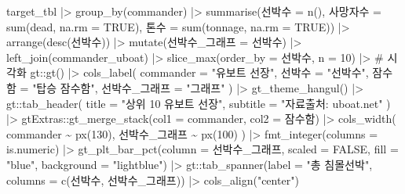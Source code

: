 \documentclass[
  letterpaper,
  chapter,a4paper,showtrims,openright,hidelinks]{oblivoir}
\newenvironment{Shaded}{\begin{snugshade}}{\end{snugshade}}
\newcommand{\AttributeTok}[1]{\textcolor[rgb]{0.40,0.45,0.13}{#1}}
\newcommand{\CommentTok}[1]{\textcolor[rgb]{0.37,0.37,0.37}{#1}}
\newcommand{\ConstantTok}[1]{\textcolor[rgb]{0.56,0.35,0.01}{#1}}
\newcommand{\DecValTok}[1]{\textcolor[rgb]{0.68,0.00,0.00}{#1}}
\newcommand{\FunctionTok}[1]{\textcolor[rgb]{0.28,0.35,0.67}{#1}}
\newcommand{\NormalTok}[1]{\textcolor[rgb]{0.00,0.23,0.31}{#1}}
\newcommand{\OtherTok}[1]{\textcolor[rgb]{0.00,0.23,0.31}{#1}}
\newcommand{\SpecialCharTok}[1]{\textcolor[rgb]{0.37,0.37,0.37}{#1}}
\newcommand{\StringTok}[1]{\textcolor[rgb]{0.13,0.47,0.30}{#1}}
\begin{document}
\begin{Shaded}
\begin{Highlighting}[]
\NormalTok{target\_tbl }\SpecialCharTok{|\textgreater{}} 
  \FunctionTok{group\_by}\NormalTok{(commander) }\SpecialCharTok{|\textgreater{}} 
  \FunctionTok{summarise}\NormalTok{(선박수 }\OtherTok{=} \FunctionTok{n}\NormalTok{(),}
\NormalTok{            사망자수 }\OtherTok{=} \FunctionTok{sum}\NormalTok{(dead, }\AttributeTok{na.rm =} \ConstantTok{TRUE}\NormalTok{),}
\NormalTok{            톤수 }\OtherTok{=} \FunctionTok{sum}\NormalTok{(tonnage, }\AttributeTok{na.rm =} \ConstantTok{TRUE}\NormalTok{)) }\SpecialCharTok{|\textgreater{}} 
  \FunctionTok{arrange}\NormalTok{(}\FunctionTok{desc}\NormalTok{(선박수)) }\SpecialCharTok{|\textgreater{}} 
  \FunctionTok{mutate}\NormalTok{(선박수\_그래프 }\OtherTok{=}\NormalTok{ 선박수) }\SpecialCharTok{|\textgreater{}} 
  \FunctionTok{left\_join}\NormalTok{(commander\_uboat) }\SpecialCharTok{|\textgreater{}} 
  \FunctionTok{slice\_max}\NormalTok{(}\AttributeTok{order\_by =}\NormalTok{ 선박수, }\AttributeTok{n =} \DecValTok{10}\NormalTok{) }\SpecialCharTok{|\textgreater{}} 
  \CommentTok{\# 시각화 }
\NormalTok{  gt}\SpecialCharTok{::}\FunctionTok{gt}\NormalTok{() }\SpecialCharTok{|\textgreater{}} 
    \FunctionTok{cols\_label}\NormalTok{(}
      \AttributeTok{commander =} \StringTok{"유보트 선장"}\NormalTok{,}
\NormalTok{      선박수 }\OtherTok{=} \StringTok{"선박수"}\NormalTok{,}
\NormalTok{      잠수함 }\OtherTok{=} \StringTok{"탑승 잠수함"}\NormalTok{,}
\NormalTok{      선박수\_그래프 }\OtherTok{=} \StringTok{"그래프"}
\NormalTok{    )  }\SpecialCharTok{|\textgreater{}} 
    \FunctionTok{gt\_theme\_hangul}\NormalTok{() }\SpecialCharTok{|\textgreater{}} 
\NormalTok{    gt}\SpecialCharTok{::}\FunctionTok{tab\_header}\NormalTok{(}
      \AttributeTok{title =} \StringTok{"상위 10 유보트 선장"}\NormalTok{, }
      \AttributeTok{subtitle =} \StringTok{"자료출처: uboat.net"}
\NormalTok{    ) }\SpecialCharTok{|\textgreater{}} 
\NormalTok{    gtExtras}\SpecialCharTok{::}\FunctionTok{gt\_merge\_stack}\NormalTok{(}\AttributeTok{col1 =}\NormalTok{ commander, }\AttributeTok{col2 =}\NormalTok{ 잠수함) }\SpecialCharTok{|\textgreater{}} 
    \FunctionTok{cols\_width}\NormalTok{(}
\NormalTok{      commander }\SpecialCharTok{\textasciitilde{}} \FunctionTok{px}\NormalTok{(}\DecValTok{130}\NormalTok{),}
\NormalTok{      선박수\_그래프 }\SpecialCharTok{\textasciitilde{}} \FunctionTok{px}\NormalTok{(}\DecValTok{100}\NormalTok{)}
\NormalTok{    ) }\SpecialCharTok{|\textgreater{}} 
    \FunctionTok{fmt\_integer}\NormalTok{(}\AttributeTok{columns =}\NormalTok{ is.numeric) }\SpecialCharTok{|\textgreater{}} 
    \FunctionTok{gt\_plt\_bar\_pct}\NormalTok{(}\AttributeTok{column =}\NormalTok{ 선박수\_그래프, }\AttributeTok{scaled =} \ConstantTok{FALSE}\NormalTok{, }\AttributeTok{fill =} \StringTok{"blue"}\NormalTok{, }\AttributeTok{background =} \StringTok{"lightblue"}\NormalTok{) }\SpecialCharTok{|\textgreater{}} 
\NormalTok{    gt}\SpecialCharTok{::}\FunctionTok{tab\_spanner}\NormalTok{(}\AttributeTok{label =} \StringTok{"총 침몰선박"}\NormalTok{, }\AttributeTok{columns =} \FunctionTok{c}\NormalTok{(선박수, 선박수\_그래프)) }\SpecialCharTok{|\textgreater{}} 
    \FunctionTok{cols\_align}\NormalTok{(}\StringTok{"center"}\NormalTok{)}
\end{Highlighting}
\end{Shaded}
\end{document}
